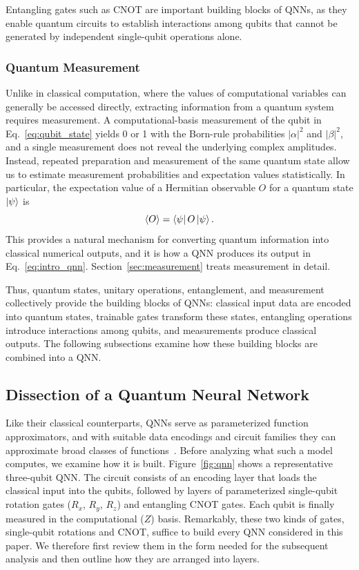 \documentclass[12pt]{article}
\numberwithin{equation}{section}  %
\begin{document}
Entangling gates such as CNOT are important building blocks of QNNs, as they enable quantum circuits to establish interactions among qubits that cannot be generated by independent single-qubit operations alone.

\subsubsection{Quantum Measurement}

Unlike in classical computation, where the values of computational variables can generally be accessed directly, extracting information from a quantum system requires measurement. A computational-basis measurement of the qubit in Eq.~\eqref{eq:qubit_state} yields 0 or 1 with the Born-rule probabilities $|\alpha|^2$ and $|\beta|^2$, and a single measurement does not reveal the underlying complex amplitudes. Instead, repeated preparation and measurement of the same quantum state allow us to estimate measurement probabilities and expectation values statistically. In particular, the expectation value of a Hermitian observable $O$ for a quantum state $\ket{\psi}$ is
\begin{equation}
    \langle O\rangle
    =\bra{\psi} O \ket{\psi}.
    \label{eq:observable_expectation}
\end{equation}
This provides a natural mechanism for converting quantum information into classical numerical outputs, and it is how a QNN produces its output in Eq.~\eqref{eq:intro_qnn}. Section~\ref{sec:measurement} treats measurement in detail.

Thus, quantum states, unitary operations, entanglement, and measurement collectively provide the building blocks of QNNs: classical input data are encoded into quantum states, trainable gates transform these states, entangling operations introduce interactions among qubits, and measurements produce classical outputs. The following subsections examine how these building blocks are combined into a QNN.

\subsection{Dissection of a Quantum Neural Network}
\label{sec:qnn_dissection}

Like their classical counterparts, QNNs serve as parameterized function approximators, and with suitable data encodings and circuit families they can approximate broad classes of functions~\cite{mitarai2018quantum, perezsalinas2020data, schuld2021effect}. Before analyzing what such a model computes, we examine how it is built. Figure~\ref{fig:qnn} shows a representative three-qubit QNN. The circuit consists of an encoding layer that loads the classical input into the qubits, followed by layers of parameterized single-qubit rotation gates ($R_x$, $R_y$, $R_z$) and entangling CNOT gates. Each qubit is finally measured in the computational ($Z$) basis. Remarkably, these two kinds of gates, single-qubit rotations and CNOT, suffice to build every QNN considered in this paper. We therefore first review them in the form needed for the subsequent analysis and then outline how they are arranged into layers.
\end{document}
